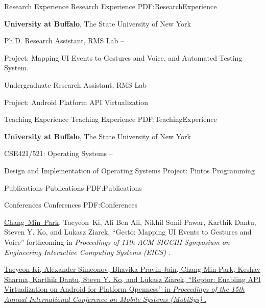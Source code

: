 \documentclass[letterpaper,MMMyyyy,nonstopmode]{simpleresumecv}
\begin{document}
\begin{Body}
\Section
{Research Experience}
{Research Experience}
{PDF:ResearchExperience}

\Entry
\textbf{University at Buffalo}, The State University of New York

\Gap
\BulletItem
Ph.D. Research Assistant, RMS Lab
\hfill
{} --
\begin{Detail}
\SubBulletItem
Project:
Mapping UI Events to Gestures and Voice, and Automated Testing System.
\end{Detail}

\Gap
\BulletItem
Undergraduate Research Assistant, RMS Lab
\hfill
{} --
\begin{Detail}
\SubBulletItem
Project:
Android Platform API Virtualization
\end{Detail}


\Section
{Teaching Experience}
{Teaching Experience}
{PDF:TeachingExperience}

\Entry
\textbf{University at Buffalo}, The State University of New York

\Gap
\BulletItem
CSE421/521: Operating Systems
\hfill
{} --
\begin{Detail}
\SubBulletItem
Design and Implementation of Operating Systems
\SubBulletItem
Project: Pintos Programming
\end{Detail}




\Section
{Publications}
{Publications}
{PDF:Publications}

\SubSection
{Conferences}
{Conferences}
{PDF:Conferences}

\begingroup
\renewcommand{\MaxNumberedItem}{[88]}

\BigGap
\NumberedItem{[1]}
\underline{Chang~Min~Park}, Taeyeon~Ki, Ali Ben Ali, 
Nikhil Sunil Pawar, Karthik Dantu, Steven Y. Ko, and Lukasz Ziarek, 
``Gesto: Mapping UI Events to Gestures and Voice''
forthcoming in
\textit{Proceedings of 11th ACM SIGCHI Symposium on Engineering Interactive Computing Systems (EICS)
.}

\Gap
\NumberedItem{[2]}
\href{https://dl.acm.org/citation.cfm?id=3081341}
{Taeyeon Ki, Alexander Simeonov, Bhavika Pravin Jain, \underline{Chang Min Park},
Keshav Sharma, Karthik Dantu, Stevn Y. Ko, and Lukasz Ziarek, 
``Reptor: Enabling API Virtualization on Android for Platform Openness'' in 
\textit{Proceedings of the 15th Annual International Conference on Mobile Systems (MobiSys)
}.}


\end{Body}
\end{document}
